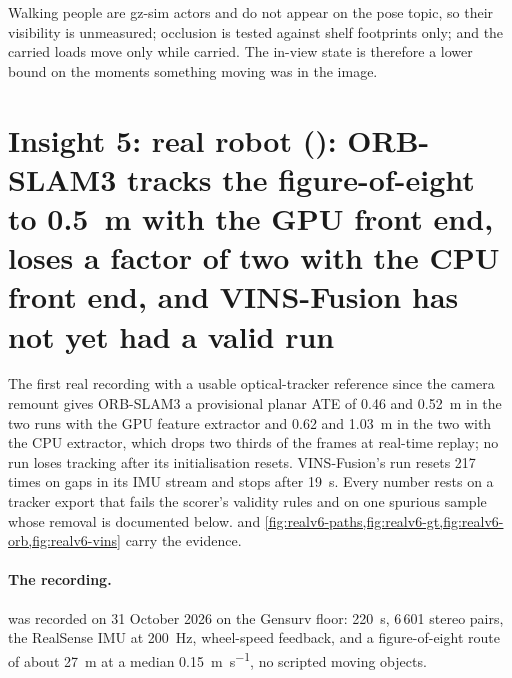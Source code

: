 \documentclass[11pt,a4paper,notitlepage]{report}
\begin{document}
\begin{queried}
Walking people are gz-sim actors and do not appear on the pose topic, so their
visibility is unmeasured; occlusion is tested against shelf footprints only; and
the carried loads move only while carried. The in-view state is therefore a
lower bound on the moments something moving was in the image.
\end{queried}

\FloatBarrier
\section{Insight 5: real robot (): ORB-SLAM3 tracks the
         figure-of-eight to \SI{0.5}{\metre} with the GPU front end, loses a factor
         of two with the CPU front end, and VINS-Fusion has not yet had a valid run}

The first real recording with a usable optical-tracker reference since the
camera remount gives ORB-SLAM3 a provisional planar ATE of \SI{0.46}{} and
\SI{0.52}{\metre} in the two runs with the GPU feature extractor and \SI{0.62}{}
and \SI{1.03}{\metre} in the two with the CPU extractor, which drops two thirds
of the frames at real-time replay; no run loses tracking after its
initialisation resets. VINS-Fusion's run resets 217 times on gaps in its IMU
stream and stops after \SI{19}{\second}. Every number rests on a tracker export
that fails the scorer's validity rules and on one spurious sample whose removal
is documented below. 
and \cref{fig:realv6-paths,fig:realv6-gt,fig:realv6-orb,fig:realv6-vins} carry
the evidence.

\paragraph{The recording.}  was recorded on 31 October
2026 on the Gensurv floor: \SI{220}{\second}, 6\,601 stereo pairs, the RealSense
IMU at \SI{200}{\hertz}, wheel-speed feedback, and a figure-of-eight route of
about \SI{27}{\metre} at a median \SI{0.15}{\metre\per\second}, no scripted
moving objects.
\end{document}

